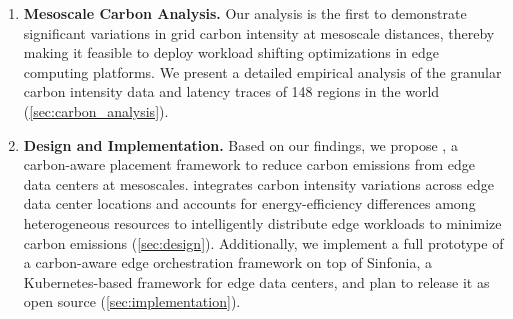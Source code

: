 \begin{enumerate}[leftmargin=*]
    \item \textbf{Mesoscale Carbon Analysis.} Our analysis is the first to demonstrate significant variations in grid carbon intensity at mesoscale distances, thereby making it feasible to deploy workload shifting optimizations in edge computing platforms.
    We present a detailed empirical analysis of the granular carbon intensity data and latency traces of 148 regions in the world (\autoref{sec:carbon_analysis}).

    

   \item \textbf{\proposedsystem Design and Implementation.} Based on our findings, we propose \proposedsystem, a carbon-aware placement framework to reduce carbon emissions from edge data centers at mesoscales. \proposedsystem integrates carbon intensity variations across edge data center locations and accounts for energy-efficiency differences among heterogeneous resources to intelligently distribute edge workloads to minimize carbon emissions (\autoref{sec:design}). Additionally, we implement a full prototype of a carbon-aware edge orchestration framework on top of Sinfonia, a Kubernetes-based framework for edge data centers, and plan to release it as open source (\autoref{sec:implementation}). 
   

\end{enumerate}
